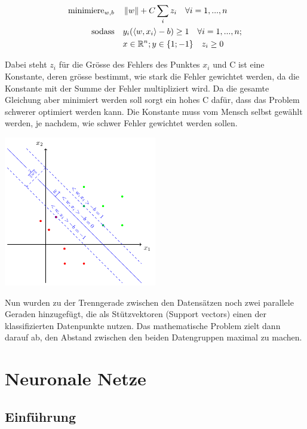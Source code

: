 \begin{align*}
	\operatorname{minimiere}_{w,b} \quad & \left\lVert w\right\rVert + C\sum_{i}{z_{i}} \quad \forall i = 1,...,n \\
	\operatorname{sodass} \quad & y_{i}(\langle w,x_{i} \rangle - b) \geq 1 \quad \forall i = 1,...,n; \\ 
	&x \in \mathbb{R}^n; y \in \{1; -1\} \quad z_{i} \geq 0 \\
\end{align*}

Dabei steht $z_{i}$ für die Grösse des Fehlers des Punktes $x_{i}$ und C ist eine Konstante, deren grösse bestimmt, wie stark die Fehler gewichtet werden, da die Konstante mit der Summe der Fehler multipliziert wird. Da die gesamte Gleichung aber minimiert werden soll sorgt ein hohes C dafür, dass das Problem schwerer optimiert werden kann. Die Konstante muss vom Mensch selbst gewählt werden, je nachdem, wie schwer Fehler gewichtet werden sollen.

\begin{dsafigure}
\begin{center}
	\includegraphics[width=0.5\textwidth]{Figure_SVM}
	\caption{Nun wurden zu der Trenngerade zwischen den Datensätzen noch zwei parallele Geraden hinzugefügt, die als Stützvektoren (Support vectors) einen der klassifizierten Datenpunkte nutzen. Das mathematische Problem zielt dann darauf ab, den Abstand zwischen den beiden Datengruppen maximal zu machen.}
	\label{SVM2}
	\end{center}
\end{dsafigure}

\section{Neuronale Netze}
\author {Farhadiba Mohammed}

\subsection{Einführung}

